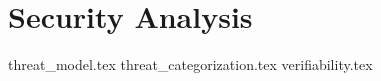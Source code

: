 \section{Security Analysis}%
\label{sec:security_analysis}



%
{threat_model.tex}
{threat_categorization.tex}
{verifiability.tex}
